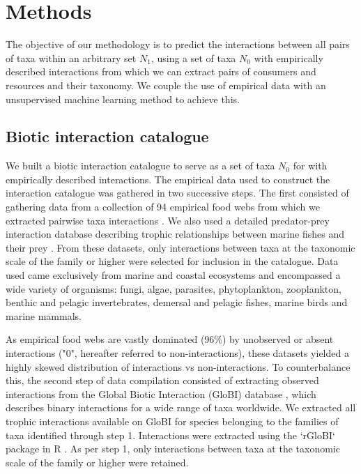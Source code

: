 \section{Methods}
The objective of our methodology is to predict the interactions between all pairs of taxa within an arbitrary set $N_1$, using a set of taxa $N_0$ with empirically described interactions from which we can extract pairs of consumers and resources and their taxonomy. We couple the use of empirical data with an unsupervised machine learning method to achieve this.

 \subsection{Biotic interaction catalogue}
We built a biotic interaction catalogue to serve as a set of taxa $N_0$ for with empirically described interactions. The empirical data used to construct the interaction catalogue was gathered in two successive steps. The first consisted of gathering data from a collection of 94 empirical food webs from which we extracted pairwise taxa interactions \citep[see ][] {brose2005, kortsch2015, universityofcanberra2016}. We also used a detailed predator-prey interaction database describing trophic relationships between marine fishes and their prey \citep{barnes2008}. From these datasets, only interactions between taxa at the taxonomic scale of the family or higher were selected for inclusion in the catalogue. Data used came exclusively from marine and coastal ecosystems and encompassed a wide variety of organisms: fungi, algae, parasites, phytoplankton, zooplankton, benthic and pelagic invertebrates, demersal and pelagic fishes, marine birds and marine mammals.

As empirical food webs are vastly dominated (96\%) by unobserved or absent interactions ("0", hereafter referred to non-interactions), these datasets yielded a highly skewed distribution of interactions vs non-interactions. To counterbalance this, the second step of data compilation consisted of extracting observed interactions from the Global Biotic Interaction (GloBI) database \citep{poelen2014}, which describes binary interactions for a wide range of taxa worldwide. We extracted all trophic interactions available on GloBI for species belonging to the families of taxa identified through step 1. Interactions were extracted using the `rGloBI` package in R \citep{poelen2015}. As per step 1, only interactions between taxa at the taxonomic scale of the family or higher were retained.

